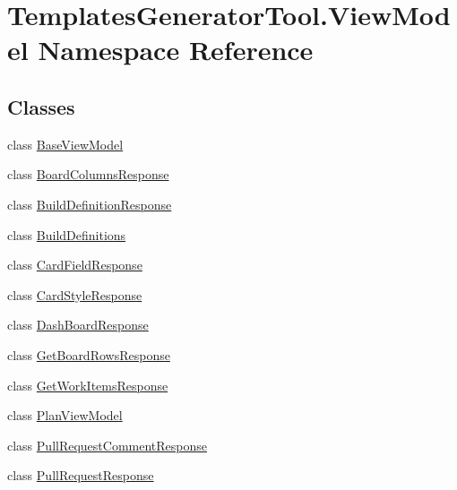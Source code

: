 \hypertarget{namespace_templates_generator_tool_1_1_view_model}{}\section{Templates\+Generator\+Tool.\+View\+Model Namespace Reference}
\label{namespace_templates_generator_tool_1_1_view_model}
\subsection*{Classes}
\begin{DoxyCompactItemize}
\item 
class \mbox{\hyperlink{class_templates_generator_tool_1_1_view_model_1_1_base_view_model}{Base\+View\+Model}}
\item 
class \mbox{\hyperlink{class_templates_generator_tool_1_1_view_model_1_1_board_columns_response}{Board\+Columns\+Response}}
\item 
class \mbox{\hyperlink{class_templates_generator_tool_1_1_view_model_1_1_build_definition_response}{Build\+Definition\+Response}}
\item 
class \mbox{\hyperlink{class_templates_generator_tool_1_1_view_model_1_1_build_definitions}{Build\+Definitions}}
\item 
class \mbox{\hyperlink{class_templates_generator_tool_1_1_view_model_1_1_card_field_response}{Card\+Field\+Response}}
\item 
class \mbox{\hyperlink{class_templates_generator_tool_1_1_view_model_1_1_card_style_response}{Card\+Style\+Response}}
\item 
class \mbox{\hyperlink{class_templates_generator_tool_1_1_view_model_1_1_dash_board_response}{Dash\+Board\+Response}}
\item 
class \mbox{\hyperlink{class_templates_generator_tool_1_1_view_model_1_1_get_board_rows_response}{Get\+Board\+Rows\+Response}}
\item 
class \mbox{\hyperlink{class_templates_generator_tool_1_1_view_model_1_1_get_work_items_response}{Get\+Work\+Items\+Response}}
\item 
class \mbox{\hyperlink{class_templates_generator_tool_1_1_view_model_1_1_plan_view_model}{Plan\+View\+Model}}
\item 
class \mbox{\hyperlink{class_templates_generator_tool_1_1_view_model_1_1_pull_request_comment_response}{Pull\+Request\+Comment\+Response}}
\item 
class \mbox{\hyperlink{class_templates_generator_tool_1_1_view_model_1_1_pull_request_response}{Pull\+Request\+Response}}

\end{DoxyCompactItemize}
